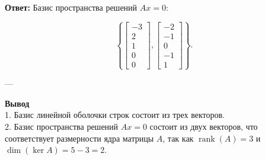 \textbf{Ответ:}  
Базис пространства решений \( Ax = 0 \):

\[
\left\{
\begin{bmatrix} -3 \\ 2 \\ 1 \\ 0 \\ 0 \end{bmatrix},
\begin{bmatrix} -2 \\ -1 \\ 0 \\ -1 \\ 1 \end{bmatrix}
\right\}.
\]

---

\textbf{Вывод}
\\1. Базис линейной оболочки строк состоит из трех векторов.  
\\2. Базис пространства решений \( Ax = 0 \) состоит из двух векторов, что соответствует размерности ядра матрицы \( A \), так как \( \operatorname{rank}(A) = 3 \) и \( \operatorname{dim}(\ker A) = 5 - 3 = 2 \).
